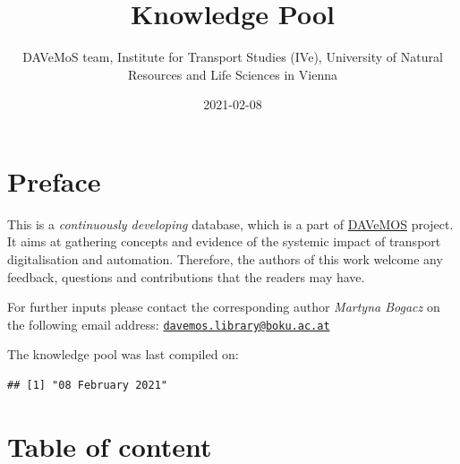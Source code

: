 \documentclass[
]{book}
\title{Knowledge Pool}
\author{DAVeMoS team, Institute for Transport Studies (IVe), University of Natural Resources and Life Sciences in Vienna}
\date{2021-02-08}
\begin{document}
\maketitle

{
\setcounter{tocdepth}{1}
\tableofcontents
}
\hypertarget{preface}{%
\chapter*{Preface}\label{preface}}

This is a \emph{continuously developing} database, which is a part of \href{https://www.davemos.online/}{DAVeMOS} project. It aims at gathering concepts and evidence of the systemic impact of transport digitalisation and automation. Therefore, the authors of this work welcome any feedback, questions and contributions that the readers may have.

For further inputs please contact the corresponding author \emph{Martyna Bogacz} on the following email address: \href{mailto:davemos.library@boku.ac.at}{\nolinkurl{davemos.library@boku.ac.at}}

The knowledge pool was last compiled on:

\begin{verbatim}
## [1] "08 February 2021"
\end{verbatim}

\hypertarget{table-of-content}{%
\chapter*{Table of content}\label{table-of-content}}
\end{document}
